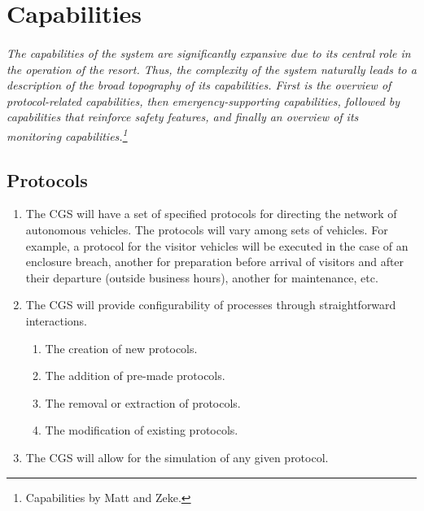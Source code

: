 \documentclass[12pt]{article}
\begin{document}
\section{Capabilities}
\label{cap}
\paragraph{}\textit{The capabilities of the system are significantly expansive due to its central role
in the operation of the resort. Thus, the complexity of the system naturally leads to a description
of the broad topography of its capabilities. First is the overview of protocol-related capabilities, then
emergency-supporting capabilities, followed by capabilities that reinforce safety features, and finally an 
overview of its monitoring capabilities.\footnote {Capabilities by Matt and Zeke.}}
	\subsection{Protocols}
	\begin{enumerate}
		\item The CGS will have a set of specified protocols for directing the network of
		autonomous vehicles. The protocols will vary among sets of vehicles. For example, a protocol for the 
		visitor vehicles will be executed in the case of an enclosure breach, another for preparation before
		arrival of visitors and after their departure (outside business hours), another for maintenance, etc.
		\item The CGS will provide configurability of processes through straightforward interactions.
		\begin{enumerate}
			\item The creation of new protocols.
			\item The addition of pre-made protocols.
			\item The removal or extraction of protocols.
			\item The modification of existing protocols.
		\end{enumerate}
		\item The CGS will allow for the simulation of any given protocol.
	\end{enumerate}
	
\end{document}
